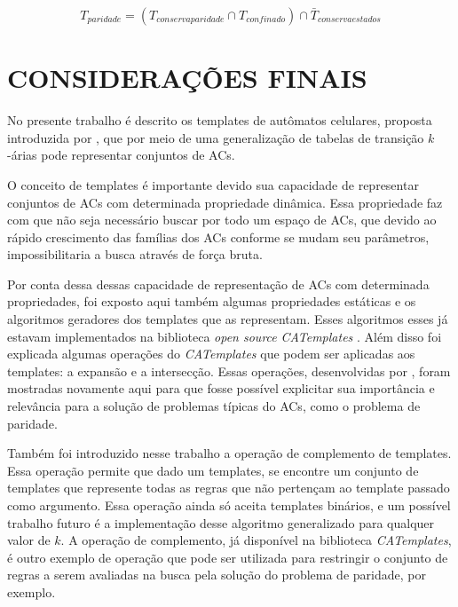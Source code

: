 	\begin{equation}
	T_{paridade} = (T_{conservaparidade} \cap T_{confinado}) \cap \bar{T}_{conservaestados}
	\label{eq:operationsTemplateParidade}
	\end{equation}

\section{CONSIDERAÇÕES FINAIS}\label{sec:conclusao}%
No presente trabalho é descrito os templates de autômatos celulares, proposta introduzida por , que por meio de uma generalização de tabelas de transição $k$-árias pode representar conjuntos de ACs.

O conceito de templates é importante devido sua capacidade de representar conjuntos de ACs com determinada propriedade dinâmica. Essa propriedade faz com que não seja necessário buscar por todo um espaço de ACs, que devido ao rápido crescimento das famílias dos ACs conforme se mudam seu parâmetros, impossibilitaria a busca através de força bruta.

Por conta dessa dessas capacidade de representação de ACs com determinada propriedades, foi exposto aqui também algumas propriedades estáticas e os algoritmos geradores dos templates que as representam. Esses algoritmos esses já estavam implementados na biblioteca \textit{open source} \textit{CATemplates} . Além disso foi explicada algumas operações do \textit{CATemplates} que podem ser aplicadas aos templates: a expansão e a intersecção. Essas operações, desenvolvidas por , foram mostradas novamente aqui para que fosse possível explicitar sua importância e relevância para a solução de problemas típicas do ACs, como o problema de paridade.

Também foi introduzido nesse trabalho a operação de complemento de templates. Essa operação permite que dado um templates, se encontre um conjunto de templates que represente todas as regras que não pertençam ao template passado como argumento. Essa operação ainda só aceita templates binários, e um possível trabalho futuro é a implementação desse algoritmo generalizado para qualquer valor de $k$. A operação de complemento, já disponível na biblioteca \textit{CATemplates}, é outro exemplo de operação que pode ser utilizada para restringir o conjunto de regras a serem avaliadas na busca pela solução do problema de paridade, por exemplo.

